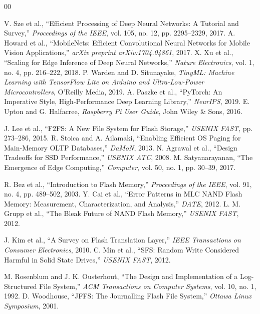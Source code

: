 \documentclass[conference]{IEEEtran}
\begin{document}
\begin{thebibliography}{00}

 V. Sze et al., ``Efficient Processing of Deep Neural Networks: A Tutorial and Survey,'' \textit{Proceedings of the IEEE}, vol. 105, no. 12, pp. 2295--2329, 2017.
 A. Howard et al., ``MobileNets: Efficient Convolutional Neural Networks for Mobile Vision Applications,'' \textit{arXiv preprint arXiv:1704.04861}, 2017.
 X. Xu et al., ``Scaling for Edge Inference of Deep Neural Networks,'' \textit{Nature Electronics}, vol. 1, no. 4, pp. 216--222, 2018.
 P. Warden and D. Situnayake, \textit{TinyML: Machine Learning with TensorFlow Lite on Arduino and Ultra-Low-Power Microcontrollers}, O'Reilly Media, 2019.
 A. Paszke et al., ``PyTorch: An Imperative Style, High-Performance Deep Learning Library,'' \textit{NeurIPS}, 2019.
 E. Upton and G. Halfacree, \textit{Raspberry Pi User Guide}, John Wiley \& Sons, 2016.

 J. Lee et al., ``F2FS: A New File System for Flash Storage,'' \textit{USENIX FAST}, pp. 273--286, 2015.
 R. Stoica and A. Ailamaki, ``Enabling Efficient OS Paging for Main-Memory OLTP Databases,'' \textit{DaMoN}, 2013.
 N. Agrawal et al., ``Design Tradeoffs for SSD Performance,'' \textit{USENIX ATC}, 2008.
 M. Satyanarayanan, ``The Emergence of Edge Computing,'' \textit{Computer}, vol. 50, no. 1, pp. 30--39, 2017.

 R. Bez et al., ``Introduction to Flash Memory,'' \textit{Proceedings of the IEEE}, vol. 91, no. 4, pp. 489--502, 2003.
 Y. Cai et al., ``Error Patterns in MLC NAND Flash Memory: Measurement, Characterization, and Analysis,'' \textit{DATE}, 2012.
 L. M. Grupp et al., ``The Bleak Future of NAND Flash Memory,'' \textit{USENIX FAST}, 2012.

 J. Kim et al., ``A Survey on Flash Translation Layer,'' \textit{IEEE Transactions on Consumer Electronics}, 2010.
 C. Min et al., ``SFS: Random Write Considered Harmful in Solid State Drives,'' \textit{USENIX FAST}, 2012.

 M. Rosenblum and J. K. Ousterhout, ``The Design and Implementation of a Log-Structured File System,'' \textit{ACM Transactions on Computer Systems}, vol. 10, no. 1, 1992.
 D. Woodhouse, ``JFFS: The Journalling Flash File System,'' \textit{Ottawa Linux Symposium}, 2001.


\end{thebibliography}
\end{document}
